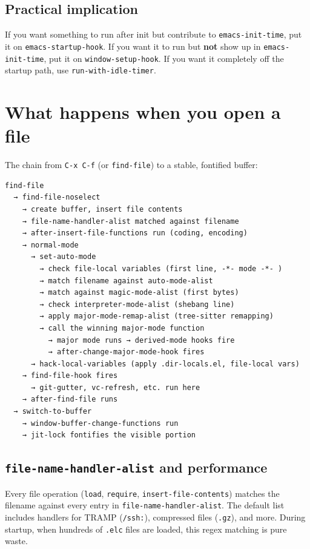 \subsection{Practical implication}\label{practical-implication}

If you want something to run after init but contribute to \texttt{emacs-init-time}, put it on \texttt{emacs-startup-hook}. If you want it to run but \textbf{not} show up in \texttt{emacs-init-time}, put it on \texttt{window-setup-hook}. If you want it completely off the startup path, use \texttt{run-with-idle-timer}.

\section{What happens when you open a file}\label{what-happens-when-you-open-a-file}

The chain from \texttt{C-x C-f} (or \texttt{find-file}) to a stable, fontified buffer:

\begin{verbatim}
find-file
  → find-file-noselect
    → create buffer, insert file contents
    → file-name-handler-alist matched against filename
    → after-insert-file-functions run (coding, encoding)
    → normal-mode
      → set-auto-mode
        → check file-local variables (first line, -*- mode -*- )
        → match filename against auto-mode-alist
        → match against magic-mode-alist (first bytes)
        → check interpreter-mode-alist (shebang line)
        → apply major-mode-remap-alist (tree-sitter remapping)
        → call the winning major-mode function
          → major mode runs → derived-mode hooks fire
          → after-change-major-mode-hook fires
      → hack-local-variables (apply .dir-locals.el, file-local vars)
    → find-file-hook fires
      → git-gutter, vc-refresh, etc. run here
    → after-find-file runs
  → switch-to-buffer
    → window-buffer-change-functions run
    → jit-lock fontifies the visible portion
\end{verbatim}

\subsection{\texttt{file-name-handler-alist} and performance}\label{file-name-handler-alist-and-performance}

Every file operation (\texttt{load}, \texttt{require}, \texttt{insert-file-contents}) matches the filename against every entry in \texttt{file-name-handler-alist}. The default list includes handlers for TRAMP (\texttt{/ssh:}), compressed files (\texttt{.gz}), and more. During startup, when hundreds of \texttt{.elc} files are loaded, this regex matching is pure waste.

